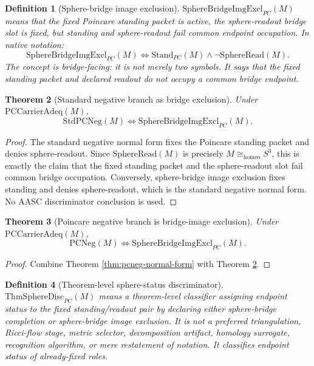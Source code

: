 \documentclass[11pt]{article}
\newtheorem{theorem}{Theorem}[section]
\newtheorem{definition}[theorem]{Definition}
\newcommand{\Sthree}{S^{3}}
\newcommand{\StandPC}{\mathrm{Stand}_{PC}}
\newcommand{\SphereRead}{\mathrm{SphereRead}}
\newcommand{\PCNeg}{\mathrm{PCNeg}}
\newcommand{\StdPCNeg}{\mathrm{StdPCNeg}}
\newcommand{\SphereBridgeImgExcl}{\mathrm{SphereBridgeImgExcl}_{PC}}
\newcommand{\ThmSphereDisc}{\mathrm{ThmSphereDisc}_{PC}}
\newcommand{\Homeo}{\cong_{\mathrm{homeo}}}
\begin{document}
\begin{definition}[Sphere-bridge image exclusion]
\(\SphereBridgeImgExcl(M)\) means that the fixed Poincare standing packet is active, the sphere-readout bridge slot is fixed, but standing and sphere-readout fail common endpoint occupation. In native notation:
\[
\SphereBridgeImgExcl(M)\Longleftrightarrow \StandPC(M)\wedge\neg\SphereRead(M).
\]
The concept is bridge-facing: it is not merely two symbols. It says that the fixed standing packet and declared readout do not occupy a common bridge endpoint.
\end{definition}

\begin{theorem}[Standard negative branch as bridge exclusion]\label{thm:stdneg-bridge-excl}
Under \(\mathrm{PCCarrierAdeq}(M)\),
\[
\StdPCNeg(M)\Longleftrightarrow \SphereBridgeImgExcl(M).
\]
\end{theorem}
\begin{proof}
The standard negative normal form fixes the Poincare standing packet and denies sphere-readout. Since \(\SphereRead(M)\) is precisely \(M\Homeo\Sthree\), this is exactly the claim that the fixed standing packet and the sphere-readout slot fail common bridge occupation. Conversely, sphere-bridge image exclusion fixes standing and denies sphere-readout, which is the standard negative normal form. No AASC discriminator conclusion is used.
\end{proof}

\begin{theorem}[Poincare negative branch is bridge-image exclusion]\label{thm:pcneg-bridge-excl}
Under \(\mathrm{PCCarrierAdeq}(M)\),
\[
\PCNeg(M)\Longleftrightarrow \SphereBridgeImgExcl(M).
\]
\end{theorem}
\begin{proof}
Combine Theorem \ref{thm:pcneg-normal-form} with Theorem \ref{thm:stdneg-bridge-excl}.
\end{proof}

\begin{definition}[Theorem-level sphere-status discriminator]
\(\ThmSphereDisc(M)\) means a theorem-level classifier assigning endpoint status to the fixed standing/readout pair by declaring either sphere-bridge completion or sphere-bridge image exclusion. It is not a preferred triangulation, Ricci-flow stage, metric selector, decomposition artifact, homology surrogate, recognition algorithm, or mere restatement of notation. It classifies endpoint status of already-fixed roles.
\end{definition}
\end{document}
